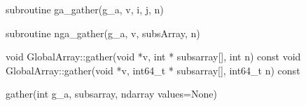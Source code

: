 \documentclass[12pt]{article}
\begin{document}
\begin{f2dapi}
\begin{fcode}
subroutine ga_gather(g_a, v, i, j, n)
\end{fcode}
\begin{funcargs}
\end{funcargs}
\end{f2dapi}
\begin{fapi}
\begin{fcode}
subroutine nga_gather(g_a, v, subsArray, n)
\end{fcode}
\begin{funcargs}
\end{funcargs}
\end{fapi}

\begin{cxxapi}
\begin{cxxcode}
void GlobalArray::gather(void *v, int * subsarray[], int n) const
void GlobalArray::gather(void *v, int64_t * subsarray[], int64_t n) const
\end{cxxcode}
\begin{funcargs}
\end{funcargs}
\end{cxxapi}

\begin{pyapi}
\begin{pycode}
gather(int g_a, subsarray, ndarray values=None)
\end{pycode}
\end{pyapi}
\ncoll
\end{document}
